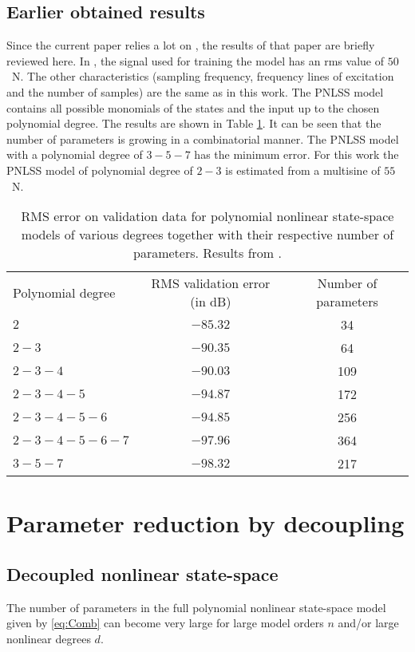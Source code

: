 \documentclass[review]{elsarticle}
\begin{document}
\subsection{Earlier obtained results}
Since the current paper relies a lot on \citep{Noel}, the results of that paper are briefly reviewed here. In \citep{Noel}, the signal used for training the model has an rms value of $50$~N. The other characteristics (sampling frequency, frequency lines of excitation and the number of samples) are the same as in this work. The PNLSS model contains all possible monomials of the states and the input up to the chosen polynomial degree. The results are shown in Table \ref{tab:MSSP}. It can be seen that the number of parameters is growing in a combinatorial manner. The PNLSS model with a polynomial degree of $3-5-7$ has the minimum error. For this work the PNLSS model of polynomial degree of $2-3$ is estimated from a multisine of $55$~N.

\begin{center}
\begin{table}
\caption{RMS error on validation data for polynomial nonlinear state-space models of various degrees together with their respective number of parameters. Results from \citep{Noel}.}
\begin{tabular}{lcc}
\hline
Polynomial degree & RMS validation error (in dB) & Number of parameters\\
$2$ & $-85.32$ & 34 \\
$2-3$ & $-90.35$ & 64 \\
$2-3-4$ & $-90.03$ & 109 \\
$2-3-4-5$ & $-94.87$ & 172 \\
$2-3-4-5-6$ & $-94.85$ & 256 \\
$2-3-4-5-6-7$ & $-97.96$ & 364 \\
$3-5-7$ & $-98.32$ & 217 \\
\hline
\end{tabular}\label{tab:MSSP}
\end{table}
\end{center}

\section{Parameter reduction by decoupling}\label{Sec:Dec}
\subsection{Decoupled nonlinear state-space\label{DECPNLSS}}
The number of parameters in the full polynomial nonlinear state-space model given by \eqref{eq:Comb} can become very large for large model orders $n$ and/or large nonlinear degrees $d$.%
\end{document}
